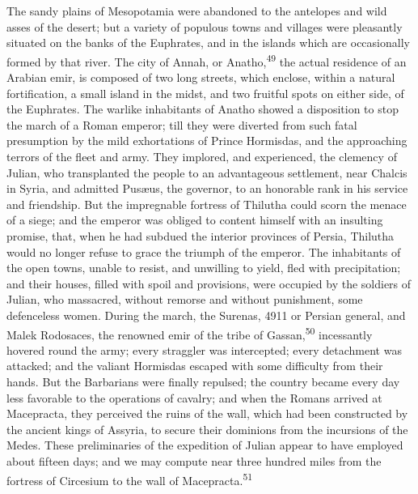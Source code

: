 The sandy plains of Mesopotamia were abandoned to the antelopes
and wild asses of the desert; but a variety of populous towns and
villages were pleasantly situated on the banks of the Euphrates,
and in the islands which are occasionally formed by that river.
The city of Annah, or Anatho,\textsuperscript{49} the actual residence of an
Arabian emir, is composed of two long streets, which enclose,
within a natural fortification, a small island in the midst, and
two fruitful spots on either side, of the Euphrates. The warlike
inhabitants of Anatho showed a disposition to stop the march of a
Roman emperor; till they were diverted from such fatal
presumption by the mild exhortations of Prince Hormisdas, and the
approaching terrors of the fleet and army. They implored, and
experienced, the clemency of Julian, who transplanted the people
to an advantageous settlement, near Chalcis in Syria, and
admitted Pusæus, the governor, to an honorable rank in his
service and friendship. But the impregnable fortress of Thilutha
could scorn the menace of a siege; and the emperor was obliged to
content himself with an insulting promise, that, when he had
subdued the interior provinces of Persia, Thilutha would no
longer refuse to grace the triumph of the emperor. The
inhabitants of the open towns, unable to resist, and unwilling to
yield, fled with precipitation; and their houses, filled with
spoil and provisions, were occupied by the soldiers of Julian,
who massacred, without remorse and without punishment, some
defenceless women. During the march, the Surenas, 4911 or Persian
general, and Malek Rodosaces, the renowned emir of the tribe of
Gassan,\textsuperscript{50} incessantly hovered round the army; every straggler
was intercepted; every detachment was attacked; and the valiant
Hormisdas escaped with some difficulty from their hands. But the
Barbarians were finally repulsed; the country became every day
less favorable to the operations of cavalry; and when the Romans
arrived at Macepracta, they perceived the ruins of the wall,
which had been constructed by the ancient kings of Assyria, to
secure their dominions from the incursions of the Medes. These
preliminaries of the expedition of Julian appear to have employed
about fifteen days; and we may compute near three hundred miles
from the fortress of Circesium to the wall of Macepracta.\textsuperscript{51}



